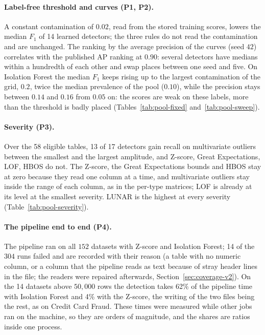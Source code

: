 \documentclass[conference]{IEEEtran}
\begin{document}
\paragraph{Label-free threshold and curves (P1, P2).} A constant contamination of $0.02$, read from the stored training scores, lowers the median $F_1$ of 14 learned detectors; the three rules do not read the contamination and are unchanged. The ranking by the average precision of the curves (seed $42$) correlates with the published AP ranking at $0.90$: several detectors have medians within a hundredth of each other and swap places between one seed and five. On Isolation Forest the median $F_1$ keeps rising up to the largest contamination of the grid, $0.2$, twice the median prevalence of the pool ($0.10$), while the precision stays between $0.14$ and $0.16$ from $0.05$ on: the scores are weak on these labels, more than the threshold is badly placed (Tables~\ref{tab:pool-fixed} and~\ref{tab:pool-sweep}).

\paragraph{Severity (P3).} Over the 58 eligible tables, 13 of 17 detectors gain recall on multivariate outliers between the smallest and the largest amplitude, and Z-score, Great Expectations, LOF, HBOS do not. The Z-score, the Great Expectations bounds and HBOS stay at zero because they read one column at a time, and multivariate outliers stay inside the range of each column, as in the per-type matrices; LOF is already at its level at the smallest severity. LUNAR is the highest at every severity (Table~\ref{tab:pool-severity}).

\paragraph{The pipeline end to end (P4).} The pipeline ran on all $152$ datasets with Z-score and Isolation Forest; 14 of the $304$ runs failed and are recorded with their reason (a table with no numeric column, or a column that the pipeline reads as text because of stray header lines in the file; the readers were repaired afterwards, Section~\ref{sec:coverage-v2}). On the 14 datasets above $50{,}000$ rows the detection takes 62\% of the pipeline time with Isolation Forest and 4\% with the Z-score, the writing of the two files being the rest, as on Credit Card Fraud. These times were measured while other jobs ran on the machine, so they are orders of magnitude, and the shares are ratios inside one process.
\end{document}
